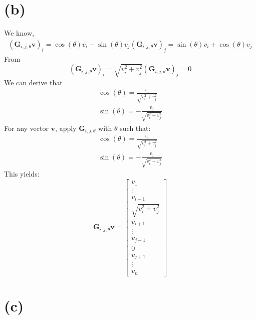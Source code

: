 \documentclass{article}
\begin{document}
\section*{(b)}
We know,
\begin{align*}
    (\bm{G}_{i,j,\theta} \bm{v})_i = \cos(\theta)v_i - \sin(\theta)v_j
    (\bm{G}_{i,j,\theta} \bm{v})_j = \sin(\theta)v_i + \cos(\theta)v_j
\end{align*}
From 
\[
    (\bm{G}_{i,j,\theta} \bm{v})_i = \sqrt{v_i^2 + v_j^2} 
    (\bm{G}_{i,j,\theta} \bm{v})_j = 0
\]
We can derive that
\begin{align*}
    \cos(\theta) = \frac{v_i}{\sqrt{v_i^2 + v_j^2}} \\
    \sin(\theta) = -\frac{v_j}{\sqrt{v_i^2 + v_j^2}}    
\end{align*}
For any vector \(\bm{v}\), apply \(\bm{G}_{i,j,\theta}\) with \(\theta\) such that:
\begin{align*}
    \cos(\theta) = \frac{v_i}{\sqrt{v_i^2 + v_j^2}} \\
    \sin(\theta) = -\frac{v_j}{\sqrt{v_i^2 + v_j^2}}
\end{align*}
This yields:
\[
    \bm{G}_{i,j,\theta}\bm{v} = \begin{bmatrix}
        v_1 \\
        \vdots \\
        v_{i-1} \\
        \sqrt{v_i^2 + v_j^2} \\
        v_{i+1} \\
        \vdots \\
        v_{j-1} \\
        0 \\
        v_{j+1} \\
        \vdots \\
        v_n
    \end{bmatrix}
\]

\section*{(c)}
\end{document}
